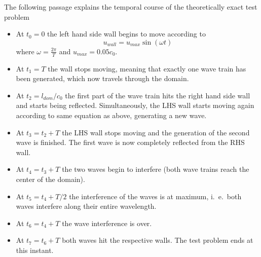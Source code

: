 \documentclass[11pt,a4paper,twoside]{report}
\begin{document}
The following passage explains the temporal course of the theoretically exact test problem

\begin{itemize} 
\item At $t_0=0$ the left hand side wall begins to move according to 
\begin{equation}
  u_{\mathit{wall}}=u_{\mathit{max}}\sin(\omega t) 
\end{equation}
  where $\omega=\frac{2\pi}{T}$ and $u_{\mathit{max}}=0.05 c_0$.


\item At $t_1=T$ the wall stops moving, meaning that exactly one wave train has been generated, which now travels through the domain.

\item At $t_2=l_{\mathit{dom}}/c_0$ the first part of the wave train hits the right hand side  wall and starts being reflected. Simultaneously, the LHS wall starts moving again according to same equation as above, generating a new wave.

\item At $t_3=t_2+T$ the LHS wall stops moving and the generation of the second wave is finished. 
The first wave is now completely reflected from the RHS wall.

\item At $t_4=t_3+T$ the two waves begin to interfere (both wave trains reach the center of the domain).

\item At $t_5=t_4+T/2$ the interference of the waves is at maximum, i.\ e.\ both waves interfere along their entire wavelength.

\item At $t_6=t_4+T$ the wave interference is over.

\item At $t_7=t_6+T$ both waves hit the respective walls. The test problem ends at this instant.
\end{itemize}


\end{document}
